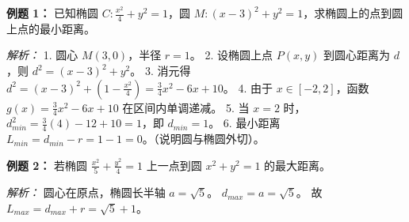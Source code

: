 \begin{examplebox}
\textbf{例题 1：} 已知椭圆 $C: \frac{x^2}{4} + y^2 = 1$，圆 $M: (x-3)^2 + y^2 = 1$，求椭圆上的点到圆上点的最小距离。

\textit{解析：} 
1. 圆心 $M(3, 0)$，半径 $r=1$。
2. 设椭圆上点 $P(x, y)$ 到圆心距离为 $d$，则 $d^2 = (x-3)^2 + y^2$。
3. 消元得 $d^2 = (x-3)^2 + (1 - \frac{x^2}{4}) = \frac{3}{4}x^2 - 6x + 10$。
4. 由于 $x \in [-2, 2]$，函数 $g(x) = \frac{3}{4}x^2 - 6x + 10$ 在区间内单调递减。
5. 当 $x=2$ 时，$d^2_{min} = \frac{3}{4}(4) - 12 + 10 = 1$，即 $d_{min} = 1$。
6. 最小距离 $L_{min} = d_{min} - r = 1 - 1 = 0$。（说明圆与椭圆外切）。

\textbf{例题 2：} 若椭圆 $\frac{x^2}{5} + \frac{y^2}{4} = 1$ 上一点到圆 $x^2 + y^2 = 1$ 的最大距离。

\textit{解析：}
圆心在原点，椭圆长半轴 $a=\sqrt{5}$。
$d_{max} = a = \sqrt{5}$。
故 $L_{max} = d_{max} + r = \sqrt{5} + 1$。
\end{examplebox}